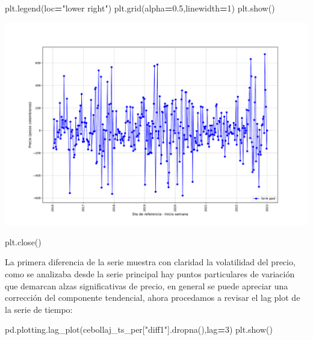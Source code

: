 \documentclass[
]{book}
\newenvironment{Shaded}{\begin{snugshade}}{\end{snugshade}}
\newcommand{\DecValTok}[1]{\textcolor[rgb]{0.00,0.00,0.81}{#1}}
\newcommand{\FloatTok}[1]{\textcolor[rgb]{0.00,0.00,0.81}{#1}}
\newcommand{\NormalTok}[1]{#1}
\newcommand{\OperatorTok}[1]{\textcolor[rgb]{0.81,0.36,0.00}{\textbf{#1}}}
\newcommand{\StringTok}[1]{\textcolor[rgb]{0.31,0.60,0.02}{#1}}
\begin{document}
\begin{Shaded}
\begin{Highlighting}[]
\NormalTok{plt.legend(loc}\OperatorTok{=}\StringTok{"lower right"}\NormalTok{)}
\NormalTok{plt.grid(alpha}\OperatorTok{=}\FloatTok{0.5}\NormalTok{,linewidth}\OperatorTok{=}\DecValTok{1}\NormalTok{)}
\NormalTok{plt.show()}
\end{Highlighting}
\end{Shaded}

\includegraphics{bookdown-demo_files/figure-latex/unnamed-chunk-100-79.pdf}

\begin{Shaded}
\begin{Highlighting}[]
\NormalTok{plt.close()}
\end{Highlighting}
\end{Shaded}

La primera diferencia de la serie muestra con claridad la volatilidad del precio, como se analizaba desde la serie principal hay puntos particulares de variación que demarcan alzas significativas de precio, en general se puede apreciar una corrección del componente tendencial, ahora procedamos a revisar el lag plot de la serie de tiempo:

\begin{Shaded}
\begin{Highlighting}[]

\NormalTok{pd.plotting.lag\_plot(cebollaj\_ts\_per[}\StringTok{"diff1"}\NormalTok{].dropna(),lag}\OperatorTok{=}\DecValTok{3}\NormalTok{)}
\NormalTok{plt.show()}
\end{Highlighting}
\end{Shaded}
\end{document}

